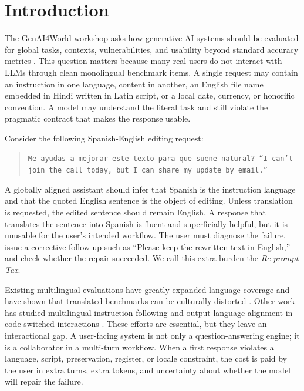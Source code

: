 \section{Introduction}

The GenAI4World workshop asks how generative AI systems should be evaluated for
global tasks, contexts, vulnerabilities, and usability beyond standard accuracy
metrics \citep{genai4world2026cfp}. This question matters because many real
users do not interact with LLMs through clean monolingual benchmark items. A
single request may contain an instruction in one language, content in another,
an English file name embedded in Hindi written in Latin script, or a local date,
currency, or honorific convention. A model may understand the literal task and
still violate the pragmatic contract that makes the response usable.

Consider the following Spanish-English editing request:
\begin{quote}\small
\texttt{Me ayudas a mejorar este texto para que suene natural? ``I can't join
the call today, but I can share my update by email.''}
\end{quote}
A globally aligned assistant should infer that Spanish is the instruction
language and that the quoted English sentence is the object of editing. Unless
translation is requested, the edited sentence should remain English. A response
that translates the sentence into Spanish is fluent and superficially helpful,
but it is unusable for the user's intended workflow. The user must diagnose the
failure, issue a corrective follow-up such as ``Please keep the rewritten text in
English,'' and check whether the repair succeeded. We call this extra burden the
\emph{Re-prompt Tax}.

Existing multilingual evaluations have greatly expanded language coverage and
have shown that translated benchmarks can be culturally distorted
\citep{singh2024globalmmlu,xuan2025mmluprox,huang2025benchmax}. Other work has
studied multilingual instruction following \citep{zhou2023ifeval,li2025xifbench}
and output-language alignment in code-switched interactions \citep{oh2026ola}.
These efforts are essential, but they leave an interactional gap. A user-facing
system is not only a question-answering engine; it is a collaborator in a
multi-turn workflow. When a first response violates a language, script,
preservation, register, or locale constraint, the cost is paid by the user in
extra turns, extra tokens, and uncertainty about whether the model will repair
the failure.

